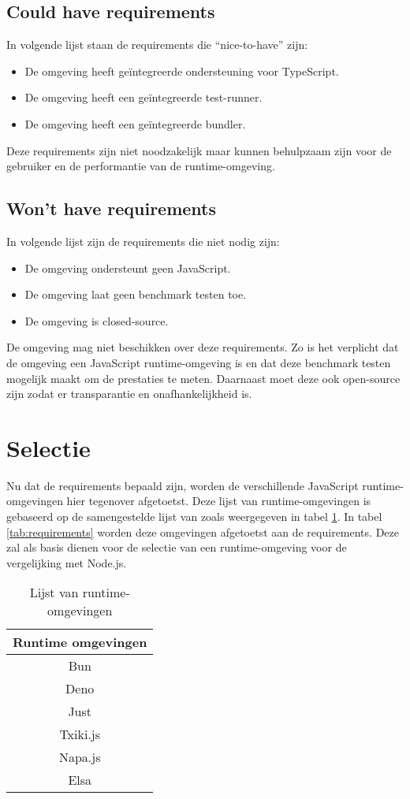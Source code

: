 \subsection{Could have requirements}
In volgende lijst staan de requirements die “nice-to-have” zijn:
\begin{itemize}
    \item De omgeving heeft geïntegreerde ondersteuning voor TypeScript.
    \item De omgeving heeft een geïntegreerde test-runner.
    \item De omgeving heeft een geïntegreerde bundler.
\end{itemize}
Deze requirements zijn niet noodzakelijk maar kunnen behulpzaam zijn voor de gebruiker en de performantie van de runtime-omgeving.

\subsection{Won't have requirements}
In volgende lijst zijn de requirements die niet nodig zijn:
\begin{itemize}
    \item De omgeving ondersteunt geen JavaScript.
    \item De omgeving laat geen benchmark testen toe. 
    \item De omgeving is closed-source.
\end{itemize}
De omgeving mag niet beschikken over deze requirements. 
Zo is het verplicht dat de omgeving een JavaScript runtime-omgeving is en dat deze benchmark testen mogelijk maakt om de prestaties te meten.
Daarnaast moet deze ook open-source zijn zodat er transparantie en onafhankelijkheid is.

\section{Selectie}
Nu dat de requirements bepaald zijn, worden de verschillende JavaScript runtime-omgevingen hier tegenover afgetoetst.
Deze lijst van runtime-omgevingen is gebaseerd op de samengestelde lijst van \textcite{Errilaz2023} 
zoals weergegeven in tabel \ref{tab:omgevingen}.
In tabel \ref{tab:requirements} worden deze omgevingen afgetoetst aan de requirements. 
Deze zal als basis dienen voor de selectie van een runtime-omgeving voor de vergelijking met Node.js.
\begin{table}[H]
    \begin{tabular}{|c|}
    \hline
    \textbf{Runtime omgevingen} \\ \hline
    Bun                         \\
    Deno                        \\
    Just                        \\
    Txiki.js                    \\
    Napa.js                     \\
    Elsa                        \\ \hline
    \end{tabular}
    \caption[Lijst runtime-omgevingen]{\label{tab:omgevingen}Lijst van runtime-omgevingen}
\end{table}


